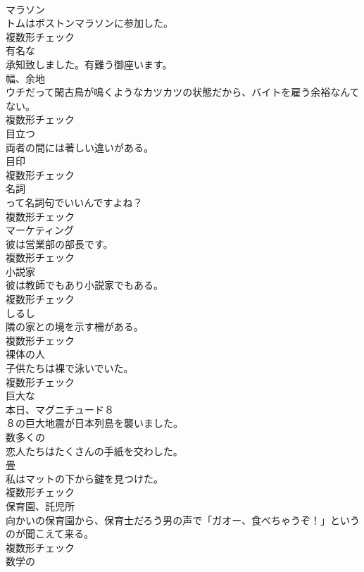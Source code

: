\documentclass[8pt]{extreport}
\begin{document}
\begin{CJK}{UTF8}{min}
\\	[名詞]	マラソン	
\\	トムはボストンマラソンに参加した。	
\\	複数形チェック
\\	[形容詞]	有名な	
\\	承知致しました。有難う御座います。	
\\	[名詞]	幅、余地	
\\	ウチだって閑古鳥が鳴くようなカツカツの状態だから、バイトを雇う余裕なんてない。	
\\	複数形チェック
\\	[形容詞]	目立つ	
\\	両者の間には著しい違いがある。	
\\	[名詞]	目印	
\\	複数形チェック
\\	[名詞]	名詞	
\\	って名詞句でいいんですよね？	
\\	複数形チェック
\\	[名詞]	マーケティング	
\\	彼は営業部の部長です。	
\\	複数形チェック
\\	[名詞]	小説家	
\\	彼は教師でもあり小説家でもある。	
\\	複数形チェック
\\	[名詞]	しるし	
\\	隣の家との境を示す柵がある。	
\\	複数形チェック
\\	[名詞]	裸体の人	
\\	子供たちは裸で泳いでいた。	
\\	複数形チェック
\\	[形容詞]	巨大な	
\\	本日、マグニチュード８
\\	８の巨大地震が日本列島を襲いました。	
\\	[形容詞]	数多くの	
\\	恋人たちはたくさんの手紙を交わした。	
\\	[名詞]	畳	
\\	私はマットの下から鍵を見つけた。	
\\	複数形チェック
\\	[名詞]	保育園、託児所	
\\	向かいの保育園から、保育士だろう男の声で「ガオー、食べちゃうぞ！」というのが聞こえて来る。	
\\	複数形チェック
\\	[形容詞]	数学の	

\end{CJK}
\end{document}

